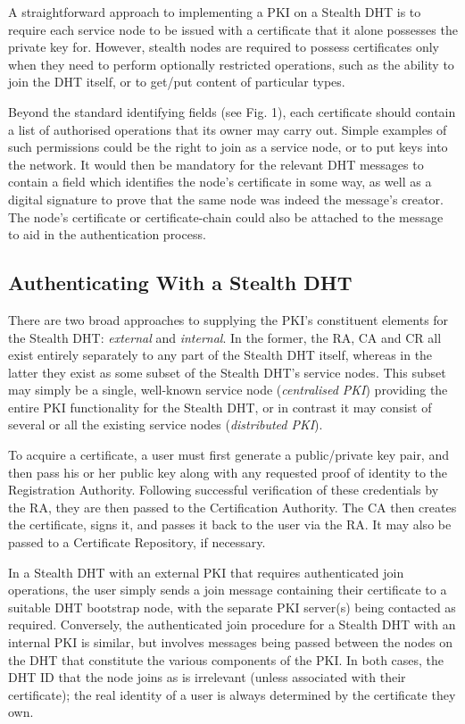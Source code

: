\documentclass[pdftex,conference,10pt]{IEEEtran}
\begin{document}
A straightforward approach to implementing a PKI on a Stealth DHT is to
require each service node to be issued with a certificate that it alone
possesses the private key for. However, stealth nodes are required to
possess certificates only when they need to perform optionally
restricted operations, such as the ability to join the DHT itself, or
to get/put content of particular types.

Beyond the standard identifying fields (see Fig. 1), each certificate
should contain a list of authorised operations that its owner may carry
out. Simple examples of such permissions could be the right to join as
a service node, or to put keys into the network. It would then be
mandatory for the relevant DHT messages to contain a field which
identifies the node's certificate in some way, as well as a digital
signature to prove that the same node was indeed the message's creator.
The node's certificate or certificate-chain could also be attached to
the message to aid in the authentication process.

\subsection{Authenticating With a Stealth DHT}
\label{subsect-joinandauth}

There are two broad approaches to supplying the PKI's constituent
elements for the Stealth DHT: \emph{external} and \emph{internal}. In
the former, the RA, CA and CR all exist entirely separately to any part
of the Stealth DHT itself, whereas in the latter they exist as some
subset of the Stealth DHT's service nodes. This subset may simply be a
single, well-known service node (\emph{centralised PKI}) providing the
entire PKI functionality for the Stealth DHT, or in contrast it may
consist of several or all the existing service nodes (\emph{distributed
PKI}).

To acquire a certificate, a user must first generate a public/private
key pair, and then pass his or her public key along with any requested
proof of identity to the Registration Authority. Following successful
verification of these credentials by the RA, they are then passed to
the Certification Authority. The CA then creates the certificate, signs
it, and passes it back to the user via the RA. It may also be passed to
a Certificate Repository, if necessary.

In a Stealth DHT with an external PKI that requires authenticated join
operations, the user simply sends a join message containing their
certificate to a suitable DHT bootstrap node, with the separate PKI
server(s) being contacted as required. Conversely, the authenticated
join procedure for a Stealth DHT with an internal PKI is similar, but
involves messages being passed between the nodes on the DHT that
constitute the various components of the PKI. In both cases, the DHT ID
that the node joins as is irrelevant (unless associated with their
certificate); the real identity of a user is always determined by the
certificate they own.
\end{document}
